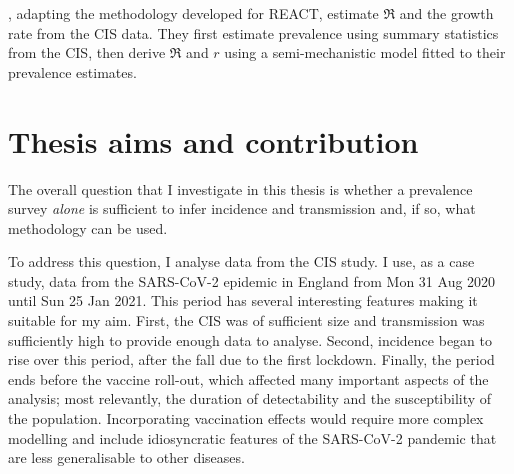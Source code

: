 \documentclass[thesis.tex]{subfiles}
\begin{document}
\Textcite{mccabeCISincidence}, adapting the methodology \textcite{ealesAppropriately} developed for REACT, estimate $\Re$ and the growth rate from the CIS data.
They first estimate prevalence using summary statistics from the CIS, then derive $\Re$ and $r$ using a semi-mechanistic model fitted to their prevalence estimates.




\section{Thesis aims and contribution} \label{intro:sec:aims}

The overall question that I investigate in this thesis is whether a prevalence survey \emph{alone} is sufficient to infer incidence and transmission and, if so, what methodology can be used.

To address this question, I analyse data from the CIS study.
I use, as a case study, data from the SARS-CoV-2 epidemic in England from Mon 31 Aug 2020 until Sun 25 Jan 2021.
This period has several interesting features making it suitable for my aim.
First, the CIS was of sufficient size and transmission was sufficiently high to provide enough data to analyse.
Second, incidence began to rise over this period, after the
fall due to the first lockdown.
Finally, the period ends before the vaccine roll-out, which  affected many important aspects of the analysis; most relevantly, the duration of detectability and the susceptibility of the population.
Incorporating vaccination effects would require more complex modelling and include idiosyncratic features of the SARS-CoV-2 pandemic that are less generalisable to other diseases.
\end{document}
